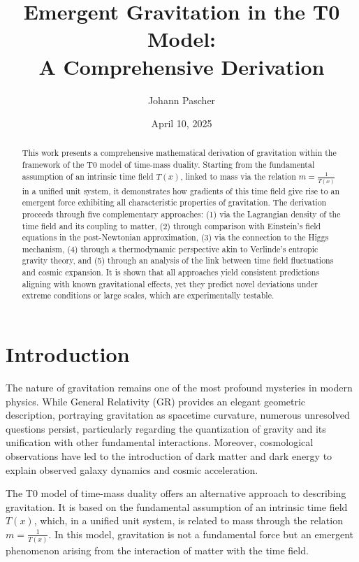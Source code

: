 \documentclass[12pt,a4paper]{article}
\title{Emergent Gravitation in the T0 Model: \\A Comprehensive Derivation}
\author{Johann Pascher}
\date{April 10, 2025}
\newcommand{\Tfield}{T(x)}
\begin{document}
	
	\maketitle
	
	\begin{abstract}
		This work presents a comprehensive mathematical derivation of gravitation within the framework of the T0 model of time-mass duality. Starting from the fundamental assumption of an intrinsic time field \(\Tfield\), linked to mass via the relation \(m = \frac{1}{\Tfield}\) in a unified unit system, it demonstrates how gradients of this time field give rise to an emergent force exhibiting all characteristic properties of gravitation. The derivation proceeds through five complementary approaches: (1) via the Lagrangian density of the time field and its coupling to matter, (2) through comparison with Einstein’s field equations in the post-Newtonian approximation, (3) via the connection to the Higgs mechanism, (4) through a thermodynamic perspective akin to Verlinde’s entropic gravity theory, and (5) through an analysis of the link between time field fluctuations and cosmic expansion. It is shown that all approaches yield consistent predictions aligning with known gravitational effects, yet they predict novel deviations under extreme conditions or large scales, which are experimentally testable.
	\end{abstract}
	
	\tableofcontents
	\newpage
	
	\section{Introduction}
	The nature of gravitation remains one of the most profound mysteries in modern physics. While General Relativity (GR) provides an elegant geometric description, portraying gravitation as spacetime curvature, numerous unresolved questions persist, particularly regarding the quantization of gravity and its unification with other fundamental interactions. Moreover, cosmological observations have led to the introduction of dark matter and dark energy to explain observed galaxy dynamics and cosmic acceleration.
	
	The T0 model of time-mass duality \cite{pascher_galaxies_2025} offers an alternative approach to describing gravitation. It is based on the fundamental assumption of an intrinsic time field \(\Tfield\), which, in a unified unit system, is related to mass through the relation \(m = \frac{1}{\Tfield}\). In this model, gravitation is not a fundamental force but an emergent phenomenon arising from the interaction of matter with the time field.
	
\end{document}
